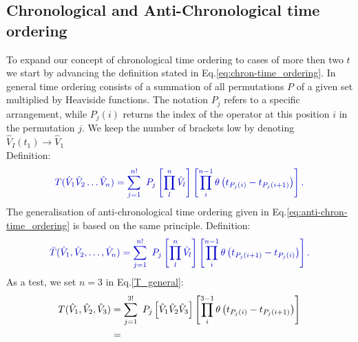 \documentclass[12pt, titlepage]{article}
\begin{document}
\begin{subappendices}
\subsection{Chronological and Anti-Chronological time ordering}\label{chronological_time}

To expand our concept  of chronological time ordering to cases of more then  two $  t $ we start by advancing the definition stated in Eq.\enskip\eqref{eq:chron-time_ordering}.
In general time ordering consists of a summation of all permutations $ P $ of a given set multiplied by Heaviside functions. The notation $ P_{j} $ refers to a specific arrangement, while $ P_{j}(i) $ returns the index of the operator at this position $ i $ in the permutation $ j $. 
We keep the number of brackets low by denoting $ \hat{V}_{I}(t_{1}) \rightarrow \hat{V}_{1} $ \\
Definition:
\begin{equation}\label{T_general}
\textcolor[RGB]{0,0,204}{
T(\hat{V}_1 \hat{V}_2\ldots\hat{V}_n)=
\sum_{j=1}^{n!}\ P_{j}
\left[
\prod^{n}_{l}\hat{V}_{l}
 \right]  
\left[
\prod^{n-1}_{i}
\theta
	\left(
	t_{P_{j}(i)}-t_{P_{j}(i+1) }
	\right)
\right]
.
}
\end{equation}
The generalisation of anti-chronological time ordering given in Eq.\enskip\eqref{eq:anti-chron-time_ordering} is based on the same principle. 
Definition:
\begin{equation}\label{T_bar_general}
\textcolor[RGB]{0,0,204}{
\bar{T}(\hat{V}_1, \hat{V}_2,\ldots,\hat{V}_n)=
\sum_{j=1}^{n!}\ P_{j}
\left[
\prod^{n}_{l}\hat{V}_{l}
 \right]  
\left[
\prod^{n-1}_{i}
\theta
	\left(
	t_{P_{j}(i+1)}-t_{P_{j}(i)}
	\right)
\right]
 .
}
\end{equation}
As a test, we set $ n=3 $ in Eq.\enskip\eqref{T_general}:
\begin{equation}
\begin{split}
T(\hat{V}_1, \hat{V}_2,\hat{V}_3)
&=
\sum_{j=1}^{3!}\ P_{j}
\left[
\hat{V}_1 \hat{V}_2\hat{V}_3
 \right]  
\left[
\prod^{3-1}_{i}
\theta
	\left(
	t_{P_{j}(i)}-t_{P_{j}(i+1) }
	\right)
\right]
\\
&=\enspace\thinspace\thinspace

\end{split}
\end{equation}
\end{subappendices}
\end{document}
